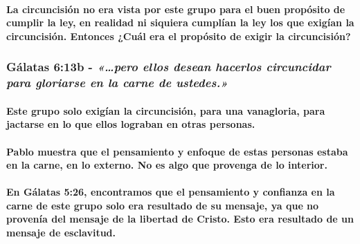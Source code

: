 \documentclass[11a pt,twoside]{article}
\newcommand{\scripture}[1]{%
  {\fontsize{12pt}{16pt}\selectfont\ScriptureFont\itshape #1}%
}
\let\oldsubsubsection\subsubsection
\renewcommand{\subsubsection}{\needspace{4\baselineskip}\oldsubsubsection}
\let\oldparagraph\paragraph
\renewcommand{\paragraph}{\needspace{3\baselineskip}\oldparagraph}
\begin{document}
\paragraph{La circuncisión no era vista por este grupo para el buen
propósito de cumplir la ley, en realidad ni siquiera cumplían la ley los
que exigían la circuncisión. Entonces ¿Cuál era el propósito de exigir
la
circuncisión?}\label{la-circuncisiuxf3n-no-era-vista-por-este-grupo-para-el-buen-propuxf3sito-de-cumplir-la-ley-en-realidad-ni-siquiera-cumpluxedan-la-ley-los-que-exiguxedan-la-circuncisiuxf3n.-entonces-cuuxe1l-era-el-propuxf3sito-de-exigir-la-circuncisiuxf3n}

\subsubsection{\texorpdfstring{Gálatas 6:13b -
\scripture{«…pero ellos desean hacerlos circuncidar para gloriarse en la carne de ustedes.»}}{Gálatas 6:13b - }}\label{guxe1latas-613b---pero-ellos-desean-hacerlos-circuncidar-para-gloriarse-en-la-carne-de-ustedes.}

\paragraph{Este grupo solo exigían la circuncisión, para una vanagloria,
para jactarse en lo que ellos lograban en otras
personas.}\label{este-grupo-solo-exiguxedan-la-circuncisiuxf3n-para-una-vanagloria-para-jactarse-en-lo-que-ellos-lograban-en-otras-personas.}

\paragraph{Pablo muestra que el pensamiento y enfoque de estas personas
estaba en la carne, en lo externo. No es algo que provenga de lo
interior.}\label{pablo-muestra-que-el-pensamiento-y-enfoque-de-estas-personas-estaba-en-la-carne-en-lo-externo.-no-es-algo-que-provenga-de-lo-interior.}

\paragraph{En Gálatas 5:26, encontramos que el pensamiento y confianza
en la carne de este grupo solo era resultado de su mensaje, ya que no
provenía del mensaje de la libertad de Cristo. Esto era resultado de un
mensaje de
esclavitud.}\label{en-guxe1latas-526-encontramos-que-el-pensamiento-y-confianza-en-la-carne-de-este-grupo-solo-era-resultado-de-su-mensaje-ya-que-no-provenuxeda-del-mensaje-de-la-libertad-de-cristo.-esto-era-resultado-de-un-mensaje-de-esclavitud.}
\end{document}
